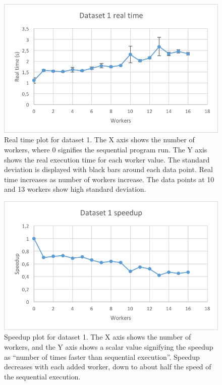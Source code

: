 \begin{figure}[ht]
  \centering
  \includegraphics[width=120mm]{figures/dataset_1/dataset_1_real_time.png}
  \caption[Real time plot for dataset 1.]{Real time plot for dataset 1. The X axis shows the number of workers, where 0 signifies the sequential program run.
  The Y axis shows the real execution time for each worker value. The standard deviation is displayed with black bars around each data point. Real time
  increases as number of workers increase. The data points at 10 and 13 workers show high standard deviation.}
  \label{fig:dataset_1_real_time}
\end{figure}

\begin{figure}[ht]
  \centering
  \includegraphics[width=120mm]{figures/dataset_1/dataset_1_speedup.png}
  \caption[Speedup plot for dataset 1.]{Speedup plot for dataset 1. The X axis shows the number of workers, and the Y axis shows a scalar value signifying the speedup as
  ``number of times faster than sequential execution''. Speedup decreases with each added worker, down to about half the speed of the sequential execution.}
  \label{fig:dataset_1_speedup}
\end{figure}

